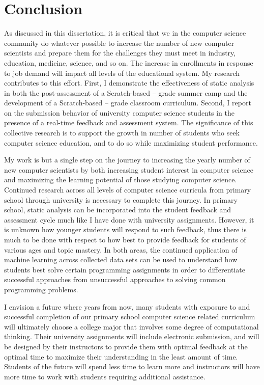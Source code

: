 \chapter{Conclusion} \label{chap:conclusion}

As discussed in this dissertation, it is critical that we in the computer
science community do whatever possible to increase the number of new computer
scientists and prepare them for the challenges they must meet in industry,
education, medicine, science, and so on. The increase in enrollments in
response to job demand will impact all levels of the educational system. My
research contributes to this effort. First, I demonstrate the effectiveness of
static analysis in both the post-assessment of a Scratch-based --
grade summer camp and the development of a Scratch-based -- grade
classroom curriculum. Second, I report on the submission behavior of university
computer science students in the presence of a real-time feedback and
assessment system. The significance of this collective research is to support
the growth in number of students who seek computer science education, and to do
so while maximizing student performance.

My work is but a single step on the journey to increasing the yearly number of
new computer scientists by both increasing student interest in computer science
and maximizing the learning potential of those studying computer
science. Continued research across all levels of computer science curricula
from primary school through university is necessary to complete this
journey. In primary school, static analysis can be incorporated into the
student feedback and assessment cycle much like I have done with university
assignments. However, it is unknown how younger students will respond to such
feedback, thus there is much to be done with respect to how best to provide
feedback for students of various ages and topic mastery. In both areas, the
continued application of machine learning across collected data sets can be
used to understand how students best solve certain programming assignments in
order to differentiate successful approaches from unsuccessful approaches to
solving common programming problems.

I envision a future where years from now, many students with exposure to and
successful completion of our primary school computer science related curriculum
will ultimately choose a college major that involves some degree of
computational thinking. Their university assignments will include electronic
submission, and will be designed by their instructors to provide them with
optimal feedback at the optimal time to maximize their understanding in the
least amount of time. Students of the future will spend less time to learn more
and instructors will have more time to work with students requiring additional
assistance.

